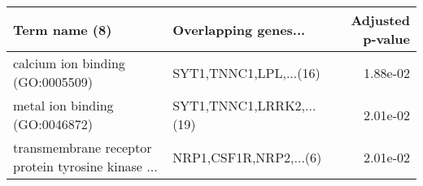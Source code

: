 \begin{tabular}{llr}
\toprule
                                     Term name (8) &     Overlapping genes... &  Adjusted p-value \\
\midrule
                  calcium ion binding (GO:0005509) &   SYT1,TNNC1,LPL,...(16) &          1.88e-02 \\
                    metal ion binding (GO:0046872) & SYT1,TNNC1,LRRK2,...(19) &          2.01e-02 \\
transmembrane receptor protein tyrosine kinase ... &   NRP1,CSF1R,NRP2,...(6) &          2.01e-02 \\
\bottomrule
\end{tabular}
